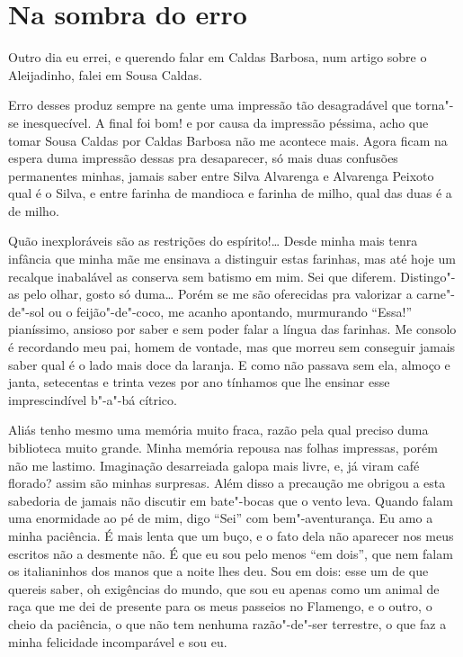 \chapter{Na sombra do erro}

Outro dia eu errei, e querendo falar em Caldas Barbosa, num artigo sobre
o Aleijadinho, falei em Sousa Caldas.

Erro desses produz sempre na gente uma impressão tão desagradável que
torna"-se inesquecível. A final foi bom! e por causa da impressão
péssima, acho que tomar Sousa Caldas por Caldas Barbosa não me acontece
mais. Agora ficam na espera duma impressão dessas pra desaparecer, só
mais duas confusões permanentes minhas, jamais saber entre Silva
Alvarenga e Alvarenga Peixoto qual é o Silva, e entre farinha de
mandioca e farinha de milho, qual das duas é a de milho.

Quão inexploráveis são as restrições do espírito!\ldots{} Desde minha mais
tenra infância que minha mãe me ensinava a distinguir estas farinhas,
mas até hoje um recalque inabalável as conserva sem batismo em mim. Sei
que diferem. Distingo"-as pelo olhar, gosto só duma\ldots{} Porém se me são
oferecidas pra valorizar a carne"-de"-sol ou o feijão"-de"-coco, me acanho
apontando, murmurando ``Essa!'' pianíssimo, ansioso por saber e sem poder
falar a língua das farinhas. Me consolo é recordando meu pai, homem de
vontade, mas que morreu sem conseguir jamais saber qual é o lado mais
doce da laranja. E como não passava sem ela, almoço e janta, setecentas
e trinta vezes por ano tínhamos que lhe ensinar esse imprescindível
b"-a"-bá cítrico.

Aliás tenho mesmo uma memória muito fraca, razão pela qual preciso duma
biblioteca muito grande. Minha memória repousa nas folhas impressas,
porém não me lastimo. Imaginação desarreiada galopa mais livre, e, já
viram café florado? assim são minhas surpresas. Além disso a precaução
me obrigou a esta sabedoria de jamais não discutir em bate"-bocas que o
vento leva. Quando falam uma enormidade ao pé de mim, digo ``Sei'' com
bem"-aventurança. Eu amo a minha paciência. É mais lenta que um buço, e o
fato dela não aparecer nos meus escritos não a desmente não. É que eu
sou pelo menos ``em dois'', que nem falam os italianinhos dos manos que a
noite lhes deu. Sou em dois: esse um de que quereis saber, oh exigências
do mundo, que sou eu apenas como um animal de raça que me dei de
presente para os meus passeios no Flamengo, e o outro, o cheio da
paciência, o que não tem nenhuma razão"-de"-ser terrestre, o que faz a
minha felicidade incomparável e sou eu.

